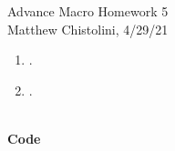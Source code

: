 \documentclass[12pt,oneside,reqno]{amsart}
\begin{document}
\begin{center}
    \Huge{Advance Macro Homework 5}\\
    \large{Matthew Chistolini, 4/29/21}
\end{center}
\vspace{-.3cm}
\begin{enumerate}
\item . \\
    
\item .\\
    \\
\end{enumerate}
{\bf Code}


\end{document}
